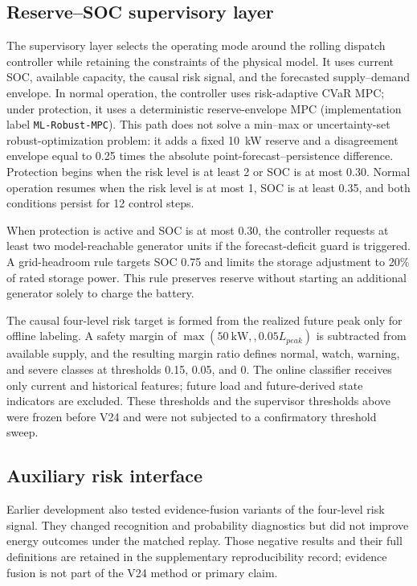 \subsection{Reserve--SOC supervisory layer}\label{soc-supervisory-layer}

The supervisory layer selects the operating mode around the rolling dispatch
controller while retaining the constraints of the physical model. It uses
current SOC, available capacity, the causal risk signal, and the forecasted
supply--demand envelope. In normal operation, the controller uses
risk-adaptive CVaR MPC; under protection, it uses a deterministic
reserve-envelope MPC (implementation label \texttt{ML-Robust-MPC}). This path
does not solve a min--max or uncertainty-set robust-optimization problem: it
adds a fixed 10~kW reserve and a disagreement envelope equal to 0.25 times the
absolute point-forecast--persistence difference. Protection begins when the
risk level is at least 2 or SOC is at most 0.30. Normal operation
resumes when the risk level is at most 1, SOC is at least 0.35, and both
conditions persist for 12 control steps.

When protection is active and SOC is at most 0.30, the controller requests at
least two model-reachable generator units if the forecast-deficit guard is
triggered. A grid-headroom rule targets SOC 0.75 and limits the storage
adjustment to 20\% of rated storage power. This rule preserves reserve without
starting an additional generator solely to charge the battery.

The causal four-level risk target is formed from the realized future peak only
for offline labeling. A safety margin of $\max(50~\mathrm{kW},,0.05L_{peak})$
is subtracted from available supply, and the resulting margin ratio defines
normal, watch, warning, and severe classes at thresholds 0.15, 0.05, and 0.
The online classifier receives only current and historical features; future
load and future-derived state indicators are excluded. These thresholds and
the supervisor thresholds above were frozen before V24 and were not subjected
to a confirmatory threshold sweep.

\subsection{Auxiliary risk interface}\label{auxiliary-risk-interface}

Earlier development also tested evidence-fusion variants of the four-level risk
signal. They changed recognition and probability diagnostics but did not improve
energy outcomes under the matched replay. Those negative results and their full
definitions are retained in the supplementary reproducibility record; evidence
fusion is not part of the V24 method or primary claim.

